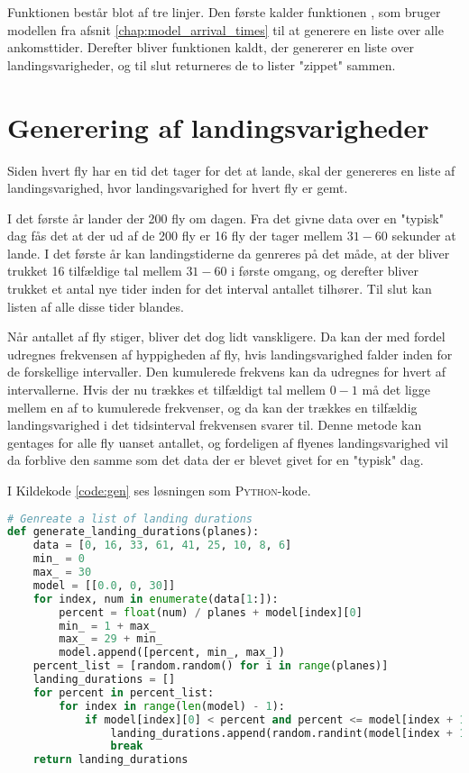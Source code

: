 Funktionen  består blot af tre linjer.
Den første kalder funktionen  , som bruger modellen fra afsnit \ref{chap:model_arrival_times} til at generere en liste over alle ankomsttider.
Derefter bliver funktionen  kaldt, der genererer en liste over landingsvarigheder, og til slut returneres de to lister "zippet" sammen.

\section{Generering af landingsvarigheder} \label{chap:landing_durations}
Siden hvert fly har en tid det tager for det at lande, skal der genereres en liste af landingsvarighed, hvor landingsvarighed for hvert fly er gemt.

I det første år lander der 200 fly om dagen. Fra det givne data over en "typisk" dag fås det at der ud af de 200 fly er 16 fly der tager mellem $31 - 60$ sekunder at lande.
I det første år kan landingstiderne da genreres på det måde, at der bliver trukket 16 tilfældige tal mellem $31 - 60$ i første omgang, og derefter bliver trukket et antal nye tider inden for det interval antallet tilhører.
Til slut kan listen af alle disse tider blandes.

Når antallet af fly stiger, bliver det dog lidt vanskligere.
Da kan der med fordel udregnes frekvensen af hyppigheden af fly, hvis landingsvarighed falder inden for de forskellige intervaller.
Den kumulerede frekvens kan da udregnes for hvert af intervallerne.
Hvis der nu trækkes et tilfældigt tal mellem $0-1$ må det ligge mellem en af to kumulerede frekvenser, og da kan der trækkes en tilfældig landingsvarighed i det tidsinterval frekvensen svarer til.
Denne metode kan gentages for alle fly uanset antallet, og fordeligen af flyenes landingsvarighed vil da forblive den samme som det data der er blevet givet for en "typisk" dag. 

I Kildekode \ref{code:gen} ses løsningen som \textsc{Python}-kode.

\begin{lstlisting}[language=Python, caption={generate\_landing\_durations-funktionen i airplanes.py}, label=code:gen]
# Genreate a list of landing durations
def generate_landing_durations(planes):
    data = [0, 16, 33, 61, 41, 25, 10, 8, 6]
    min_ = 0
    max_ = 30
    model = [[0.0, 0, 30]]
    for index, num in enumerate(data[1:]):
        percent = float(num) / planes + model[index][0]
        min_ = 1 + max_
        max_ = 29 + min_
        model.append([percent, min_, max_])
    percent_list = [random.random() for i in range(planes)]
    landing_durations = []
    for percent in percent_list:
        for index in range(len(model) - 1):
            if model[index][0] < percent and percent <= model[index + 1][0]:
                landing_durations.append(random.randint(model[index + 1][1], model[index + 1][2]))
                break
    return landing_durations
\end{lstlisting}

